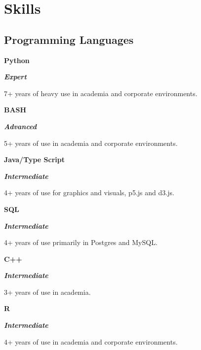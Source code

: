 \section{Skills}

\newcommand{\skill}[3]{
\parbox{0.02 \linewidth}{\hfill}
\parbox{0.18 \linewidth}{\textbf{#1}}
\parbox{0.15\linewidth}{\textit{#2}}
\parbox[t]{0.55\linewidth}{#3}
\medskip
}



\newcommand{\skillplus}[4]{
\parbox{0.02 \linewidth}{\hfill}
\parbox{0.18 \linewidth}{\textbf{#1}}
\parbox{0.15\linewidth}{#2}
\parbox[t]{0.7\linewidth}{#3}
\\
\parbox[t]{0.05\linewidth}{\hfill}\parbox[t]{0.95\linewidth}{#4}
\medskip
}


\subsection{Programming Languages}

\newcommand{\expert}{\textbf{\color{expert} Expert} }

\newcommand{\advanced}{\textbf{\color{advanced} Advanced} }

\newcommand{\intermediate}{\textbf{\color{intermediate} Intermediate} }

\newcommand{\proficient}{\textbf{\color{proficient} Proficient} }

\skill{Python}{\expert{}}{7+ years of heavy use in academia and corporate environments.}

\skill{BASH}{\advanced{}}{5+ years of use in academia and corporate environments.}

\skill{Java/Type Script}{\intermediate}{4+ years of use for graphics and visuals, p5.js and d3.js.}

\skill{SQL}{\intermediate{}}{4+ years of use primarily in Postgres and MySQL.}

\skill{C++}{\intermediate{}}{3+ years of use in academia.}

\skill{R}{\intermediate{}}{4+ years of use in academia and corporate environments.}

